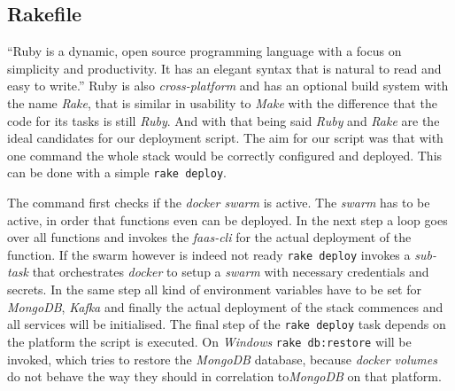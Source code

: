 \subsection{Rakefile}

“Ruby is a dynamic, open source programming language with a focus on simplicity and productivity. It
has an elegant syntax that is natural to read and easy to write.” \cite{ruby} Ruby is also
\textit{cross-platform} and has an optional build system with the name \textit{Rake}, that is
similar in usability to \textit{Make} with the difference that the code for its tasks is still
\textit{Ruby}. And with that being said \textit{Ruby} and \textit{Rake} are the ideal candidates for
our deployment script. The aim for our script was that with one command the whole stack would be
correctly configured and deployed. This can be done with a simple \lstinline{rake deploy}.

The command first checks if the \textit{docker swarm} is active. The \textit{swarm} has to be
active, in order that functions even can be deployed. In the next step a loop goes over all
functions and invokes the \textit{faas-cli} for the actual deployment of the function. If the swarm
however is indeed not ready \lstinline{rake deploy} invokes a \textit{sub-task} that orchestrates
\textit{docker} to setup a \textit{swarm} with necessary credentials and secrets. In the same step
all kind of environment variables have to be set for \textit{MongoDB}, \textit{Kafka} and finally
the actual deployment of the stack commences and all services will be initialised. The final step of
the \lstinline{rake deploy} task depends on the platform the script is executed. On \textit{Windows}
\lstinline{rake db:restore} will be invoked, which tries to restore the \textit{MongoDB} database,
because \textit{docker volumes} do not behave the way they should in correlation to\textit{MongoDB}
on that platform.